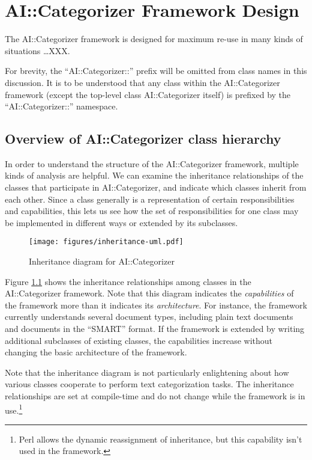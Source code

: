 \documentclass[a4paper]{report}
\begin{document}
\chapter{AI::Categorizer Framework Design}

The AI::Categorizer framework is designed for maximum re-use in many
kinds of situations \ldots XXX.

For brevity, the ``AI::Categorizer::'' prefix will be omitted from class
names in this discussion.  It is to be understood that any class
within the AI::Categorizer framework (except the top-level class
AI::Categorizer itself) is prefixed by the ``AI::Categorizer::''
namespace.

\section{Overview of AI::Categorizer class hierarchy}

In order to understand the structure of the AI::Categorizer framework,
multiple kinds of analysis are helpful.  We can examine the
inheritance relationships of the classes that participate in
AI::Categorizer, and indicate which classes inherit from each other.
Since a class generally is a representation of certain
responsibilities and capabilities, this lets us see how the set of
responsibilities for one class may be implemented in different ways or
extended by its subclasses.

\begin{figure}
\texttt{[image: figures/inheritance-uml.pdf]}
\caption{Inheritance diagram for AI::Categorizer}
\label{inheritance-uml}
\end{figure}

Figure \ref{inheritance-uml} shows the inheritance relationships among
classes in the AI::Categorizer framework.  Note that this diagram
indicates the \emph{capabilities} of the framework more than it
indicates its \emph{architecture}.  For instance, the framework
currently understands several document types, including plain text
documents and documents in the ``SMART'' format.  If the framework is
extended by writing additional subclasses of existing classes, the
capabilities increase without changing the basic architecture of the
framework.

Note that the inheritance diagram is not particularly enlightening
about how various classes cooperate to perform text categorization
tasks.  The inheritance relationships are set at compile-time and do
not change while the framework is in use.\footnote{Perl allows the
dynamic reassignment of inheritance, but this capability isn't used
in the framework.}
\end{document}
